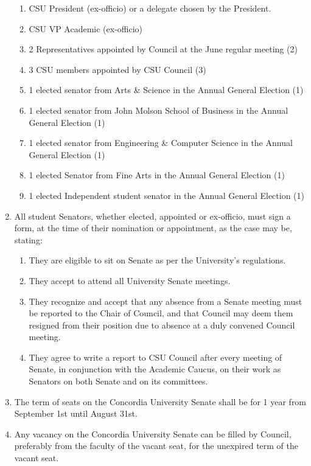 \documentclass[oneside]{book}
\begin{document}
\begin{enumerate}
\begin{enumerate}
\item CSU President (ex-officio) or a delegate chosen by the President. 
\item CSU VP Academic (ex-officio) 
\item 2 Representatives appointed by Council at the June regular meeting
(2) 
\item 3 CSU members appointed by CSU Council (3) 
\item 1 elected senator from Arts \& Science in the Annual General Election
(1) 
\item 1 elected senator from John Molson School of Business in the Annual
General Election (1) 
\item 1 elected senator from Engineering \& Computer Science in the Annual
General Election (1) 
\item 1 elected Senator from Fine Arts in the Annual General Election (1) 
\item 1 elected Independent student senator in the Annual General Election
(1) 
\end{enumerate}
\item \label{enu:senate-required-form}All student Senators, whether elected,
appointed or ex-officio, must sign a form, at the time of their nomination
or appointment, as the case may be, stating: 

\begin{enumerate}
\item They are eligible to sit on Senate as per the University's regulations. 
\item They accept to attend all University Senate meetings. 
\item They recognize and accept that any absence from a Senate meeting must
be reported to the Chair of Council, and that Council may deem them
resigned from their position due to absence at a duly convened Council
meeting. 
\item They agree to write a report to CSU Council after every meeting of
Senate, in conjunction with the Academic Caucus, on their work as
Senators on both Senate and on its committees. 
\end{enumerate}
\item The term of seats on the Concordia University Senate shall be for
1 year from September 1st until August 31st. 
\item Any vacancy on the Concordia University Senate can be filled by Council,
preferably from the faculty of the vacant seat, for the unexpired
term of the vacant seat. 


\end{enumerate}
\end{document}

